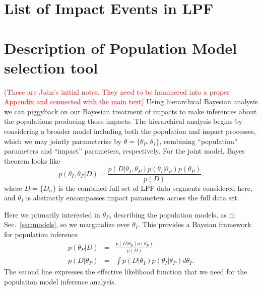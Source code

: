 \documentclass[twocolumn, trackchanges]{aastex62}
\newcommand{\red}[1]{\textcolor{red}{#1}}
\begin{document}




 \appendix
 \section{List of Impact Events in LPF}


\appendix
\section{Description of Population Model selection tool}
\red{(These are John's initial notes. They need to be hammered into a proper Appendix and connected with the main text)}
Using hierarchical Bayesian analysis we can piggyback on our Bayesian treatment of impacts to make inferences about the populations producing those impacts. The hierarchical analysis begins by considering a broader model including both the population and impact processes, which we may jointly parameterize by $\theta=\{\theta_P,\theta_I\}$, combining ``population'' parameters and ``impact'' parameters, respectively.  For the joint model, Bayes theorem looks like
\begin{equation}
  p(\theta_I,\theta_P|D)=\frac{p(D|\theta_I,\theta_P)p(\theta_I|\theta_P)p(\theta_P)}{p(D)}.
\end{equation}
where $D=\{D_\alpha\}$ is the combined full set of LPF data segments considered here, and $\theta_I$ is abstractly encompasses impact parameters across the full data set.

Here we primarily interested in $\theta_P$, describing the population models, as in Sec.~\ref{sec:models}, so we marginalize over $\theta_I$.  This provides a Baysian framework for population inference
\begin{eqnarray}
  p(\theta_P|D)&=&\frac{ p(D|\theta_P)p(\theta_P)}{p(D)}\label{eq:HierBayesThm}\\
  p(D|\theta_P)&=&\int p(D|\theta_I)p(\theta_I|\theta_P)d\theta_I\label{eq:metaLike}.
\end{eqnarray}
The second line expresses the effective likelihood function that we need for the population model inference analysis.
\end{document}
